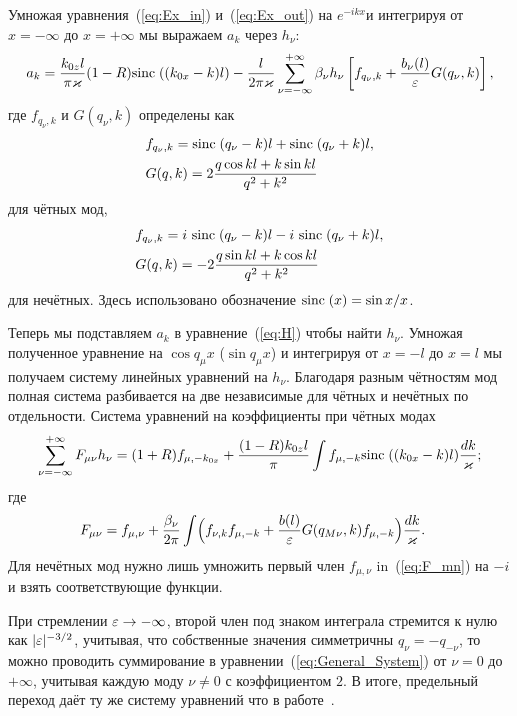 Умножая уравнения~(\ref{eq:Ex_in}) и~(\ref{eq:Ex_out}) на $e^{-ikx}$и интегрируя от $x = -\infty$ до $x = +\infty$  
мы выражаем $a_k$ через $h_\nu$:
\begin{align}
a_k = \frac{k_{0z}l }{\pi \varkappa} (1-R)\mathrm{sinc}\;((k_{0x}-k)l) 
        - \frac{l}{2 \pi \varkappa}\sum_{\nu = -\infty}^{+\infty} \beta_\nu h_\nu\left[f_{q_\nu,k}
+ \frac{b_\nu(l)}{\varepsilon}G(q_\nu,k)\right],
\end{align}
где $f_{q_\nu,k}$ и $G(q_\nu,k)$ определены как 
\begin{align*}
&f_{q_\nu,k} =
\mathrm{sinc}\;(q_\nu-k)l + \mathrm{sinc}\;(q_\nu+k)l,\\
&G(q,k) = 2\frac{q\cos{kl}+k\sin{kl}}{q^2 + k^2}\\
\end{align*}
для чётных мод,
\begin{align}
&f_{q_\nu,k} = i\ \mathrm{sinc}\;(q_\nu-k)l - i\ \mathrm{sinc}\;(q_\nu+k)l,\nonumber\\
& G(q,k) = -2\frac{q\sin{kl}+k\cos{kl}}{q^2 + k^2}
\end{align}
для нечётных.
Здесь использовано обозначение  $\mathrm{sinc}\;(x) = {\sin{x}}/{x}$.

Теперь мы подставляем $a_k$ в уравнение~(\ref{eq:H}) чтобы найти $h_\nu$. Умножая полученное уравнение на  $\cos{q_\mu x}$ ($\sin{q_\mu x}$) 
и интегрируя от $x = -l$ до $x = l$ мы получаем систему линейных уравнений на $h_\nu$. Благодаря разным чётностям мод полная система
разбивается на две независимые для чётных и нечётных по отдельности. Система уравнений на коэффициенты при чётных модах 
\begin{align}
	\sum_{\nu=-\infty}^{+\infty} F_{\mu \nu} h_\nu = (1+R)f_{\mu,-k_{0x}} + \frac{(1-R)k_{0z} l}{\pi}\int f_{\mu,-k}\mathrm{sinc}\;((k_{0x}-k)l) \frac{dk}{\varkappa}; \label{eq:General_System}
\end{align}
где 
\begin{align}
F_{\mu \nu} &= f_{\mu,\nu} + \frac{\beta_\nu}{2\pi}\int
\Bigl(f_{\nu,k}f_{\mu,-k}  + \frac{b(l)}{\varepsilon} G(q_{M\nu},k)f_{\mu,-k} \Bigr)\frac{dk}{\varkappa}.
\label{eq:F_mn}
\end{align}
Для нечётных мод нужно лишь умножить первый член $f_{\mu,\nu}$ in~(\ref{eq:F_mn}) на $-i$ и взять соответствующие функции. 

При стремлении $\varepsilon \to -\infty$, второй член под знаком интеграла стремится к нулю как $\lvert\varepsilon\rvert^{-3/2}$, 
учитывая, что собственные значения симметричны $q_{\nu} = -q_{-\nu}$, то можно проводить суммирование в уравнении~(\ref{eq:General_System}) 
от $\nu = 0$ до $+\infty$, учитывая каждую моду $\nu \neq 0$ с коэффициентом $2$. В итоге, предельный переход даёт ту же систему
уравнений что в работе~\cite{Shapiro16}.

